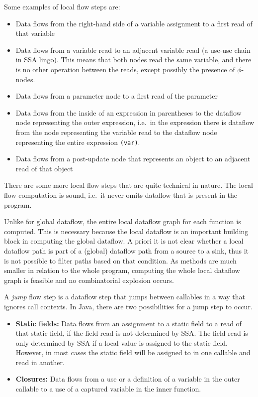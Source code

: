 Some examples of local flow steps are:
\begin{itemize}
    \item Data flows from the right-hand side of a variable assignment to a 
    first read of that variable
    \item Data flows from a variable read to an adjacent variable read (a use-use chain in SSA lingo).
    This means that both nodes read the same variable, and there is no other operation between the 
    reads, except possibly the presence of $\phi$-nodes.
    \item Data flows from a parameter node to a first read of the parameter
    \item Data flows from the inside of an expression in parentheses to the dataflow node
    representing the outer expression, i.e.\ in the expression  there is dataflow from the node 
    representing the variable read  to the dataflow node representing the entire expression \texttt{(var)}.
    \item Data flows from a post-update node that represents an object to an adjacent read 
    of that object
\end{itemize}
There are some more local flow steps that are quite technical in nature.
The local flow computation is sound, i.e.\ it never omits dataflow that is 
present in the program.

 Unlike for global dataflow, the entire local dataflow graph for each function 
is computed.
This is necessary because the local dataflow is an important building block in computing
the global dataflow.
A priori it is not clear whether a local dataflow path is part of a (global) dataflow path
from a source to a sink, thus it is not possible to filter paths based on that condition.
As methods are much smaller in relation to the whole program, computing the whole local 
dataflow graph is feasible and no combinatorial explosion occurs.

A \emph{jump} flow step is a dataflow step that jumps between callables 
in a way that ignores call contexts.
In Java, there are two possibilities for a jump step to occur.
\begin{itemize}
    \item \textbf{Static fields:} Data flows from an assignment to a static field
     to a read of that static field, if the field read is not determined by SSA.
    The field read is only determined by SSA if a local value is assigned to the
    static field.
    However, in most cases the static field will be assigned to in one callable
    and read in another.
    \item \textbf{Closures:} Data flows from a use or a definition of a variable
    in the outer callable to a use of a captured variable in the inner function.
\end{itemize}

